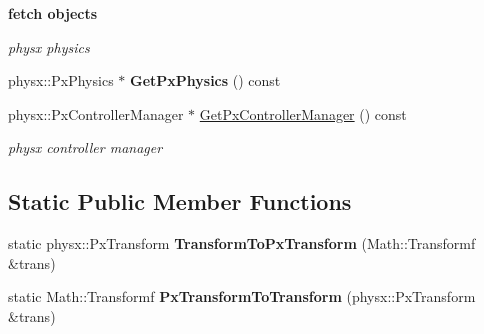 \begin{Indent}{\bf fetch objects}\par
{\em \label{_amgrpb712734d7b6a37d417e36727149b52a3}
 physx physics }\begin{DoxyCompactItemize}
\item 
\hypertarget{classContent_1_1Physics_1_1PhysX_1_1Physics_a8b14817cfe6829494e00c7e8e942ec4a}{
physx::PxPhysics $\ast$ {\bfseries GetPxPhysics} () const }
\label{classContent_1_1Physics_1_1PhysX_1_1Physics_a8b14817cfe6829494e00c7e8e942ec4a}

\item 
\hypertarget{classContent_1_1Physics_1_1PhysX_1_1Physics_acdcf6d401b5a223f0bc8c4bc210c13d3}{
physx::PxControllerManager $\ast$ \hyperlink{classContent_1_1Physics_1_1PhysX_1_1Physics_acdcf6d401b5a223f0bc8c4bc210c13d3}{GetPxControllerManager} () const }
\label{classContent_1_1Physics_1_1PhysX_1_1Physics_acdcf6d401b5a223f0bc8c4bc210c13d3}

\begin{DoxyCompactList}\small\item\em physx controller manager \item\end{DoxyCompactList}\end{DoxyCompactItemize}
\end{Indent}
\subsection*{Static Public Member Functions}
\begin{DoxyCompactItemize}
\item 
\hypertarget{classContent_1_1Physics_1_1PhysX_1_1Physics_adc7427b3402229c8ff6ca4c26a937a3f}{
static physx::PxTransform {\bfseries TransformToPxTransform} (Math::Transformf \&trans)}
\label{classContent_1_1Physics_1_1PhysX_1_1Physics_adc7427b3402229c8ff6ca4c26a937a3f}

\item 
\hypertarget{classContent_1_1Physics_1_1PhysX_1_1Physics_a0e36fa04152faed01f97cfc25a1640f9}{
static Math::Transformf {\bfseries PxTransformToTransform} (physx::PxTransform \&trans)}
\label{classContent_1_1Physics_1_1PhysX_1_1Physics_a0e36fa04152faed01f97cfc25a1640f9}

\end{DoxyCompactItemize}

